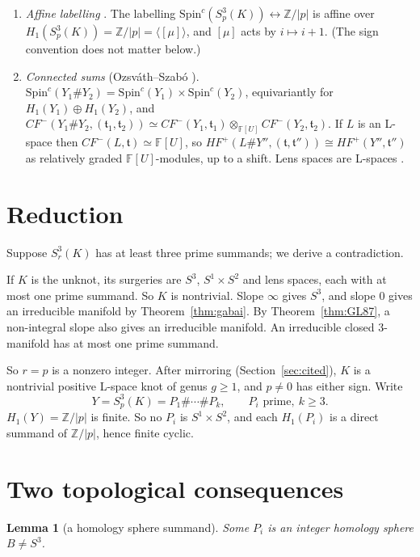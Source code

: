\documentclass[11pt]{article}
\newtheorem{lemma}[theorem]{Lemma}
\theoremstyle{definition}
\newcommand{\F}{\mathbb{F}}
\newcommand{\Z}{\mathbb{Z}}
\newcommand{\HFp}{\mathit{HF}^+}
\newcommand{\CFm}{\mathit{CF}^-}
\newcommand{\Spinc}{\mathrm{Spin}^c}
\begin{document}
\begin{enumerate}[label=(H\arabic*),leftmargin=*]
\item\label{H:affine} \emph{Affine labelling} \cite{OSinteger}. The labelling $\Spinc(S^3_p(K))\leftrightarrow\Z/|p|$ is affine over $H_1(S^3_p(K))=\Z/|p|=\langle[\mu]\rangle$, and $[\mu]$ acts by $i\mapsto i+1$. (The sign convention does not matter below.)

\item\label{H:sum} \emph{Connected sums} (Ozsv\'ath--Szab\'o \cite{OSapp}). $\Spinc(Y_1\#Y_2)=\Spinc(Y_1)\times\Spinc(Y_2)$, equivariantly for $H_1(Y_1)\oplus H_1(Y_2)$, and $\CFm(Y_1\#Y_2,(\mathfrak t_1,\mathfrak t_2))\simeq\CFm(Y_1,\mathfrak t_1)\otimes_{\F[U]}\CFm(Y_2,\mathfrak t_2)$. If $L$ is an L-space then $\CFm(L,\mathfrak t)\simeq\F[U]$, so $\HFp(L\#Y'',(\mathfrak t,\mathfrak t''))\cong\HFp(Y'',\mathfrak t'')$ as relatively graded $\F[U]$-modules, up to a shift. Lens spaces are L-spaces \cite{OSlens}.
\end{enumerate}

\section{Reduction}\label{sec:reduction}

Suppose $S^3_r(K)$ has at least three prime summands; we derive a contradiction.

If $K$ is the unknot, its surgeries are $S^3$, $S^1\times S^2$ and lens spaces, each with at most one prime summand. So $K$ is nontrivial. Slope $\infty$ gives $S^3$, and slope $0$ gives an irreducible manifold by Theorem~\ref{thm:gabai}. By Theorem~\ref{thm:GL87}, a non-integral slope also gives an irreducible manifold. An irreducible closed $3$-manifold has at most one prime summand.

So $r=p$ is a nonzero integer. After mirroring (Section~\ref{sec:cited}), $K$ is a nontrivial positive L-space knot of genus $g\ge1$, and $p\ne0$ has either sign. Write
\[
Y=S^3_p(K)=P_1\#\cdots\#P_k,\qquad P_i \text{ prime},\ k\ge3.
\]
$H_1(Y)=\Z/|p|$ is finite. So no $P_i$ is $S^1\times S^2$, and each $H_1(P_i)$ is a direct summand of $\Z/|p|$, hence finite cyclic.

\section{Two topological consequences}\label{sec:topo}

\begin{lemma}[a homology sphere summand]\label{lem:hs}
Some $P_i$ is an integer homology sphere $B\ne S^3$.
\end{lemma}
\end{document}
